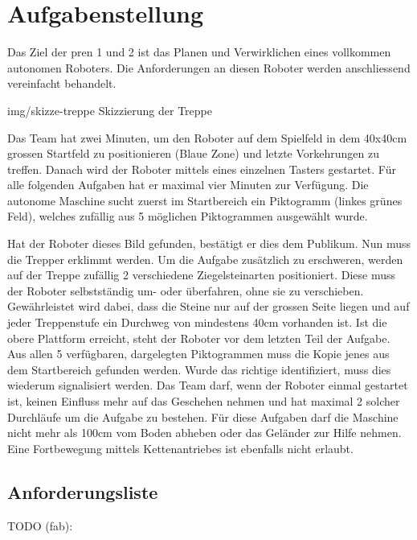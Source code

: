 \section{Aufgabenstellung}

Das Ziel der \acrfull{pren} 1 und 2 ist das Planen und Verwirklichen eines vollkommen autonomen Roboters. Die Anforderungen an diesen Roboter werden anschliessend vereinfacht behandelt. 

\image
 {img/skizze-treppe}
 {Skizzierung der Treppe}
 
Das Team hat zwei Minuten, um den Roboter auf dem Spielfeld in dem 40x40cm grossen 
Startfeld zu positionieren (Blaue Zone) und letzte Vorkehrungen zu treffen. 
Danach wird der Roboter mittels eines einzelnen Tasters gestartet. 
Für alle folgenden Aufgaben hat er maximal vier Minuten zur Verfügung. 
Die autonome Maschine sucht zuerst im Startbereich ein Piktogramm 
(linkes grünes Feld), welches zufällig aus 5 möglichen Piktogrammen ausgewählt wurde. 

Hat der Roboter dieses Bild gefunden, bestätigt er dies dem Publikum. 
Nun muss die Trepper erklimmt werden. Um die Aufgabe zusätzlich zu erschweren,
werden auf der Treppe zufällig 2 verschiedene Ziegelsteinarten positioniert. 
Diese muss der Roboter selbstständig um- oder überfahren, ohne sie zu verschieben.
Gewährleistet wird dabei, dass die Steine nur auf der grossen Seite liegen 
und auf jeder Treppenstufe ein Durchweg von mindestens 40cm vorhanden ist. 
Ist die obere Plattform erreicht, steht der Roboter vor dem letzten Teil der Aufgabe. 
Aus allen 5 verfügbaren, dargelegten Piktogrammen muss die Kopie jenes aus dem 
Startbereich gefunden werden. Wurde das richtige identifiziert, 
muss dies wiederum signalisiert werden. Das Team darf,
wenn der Roboter einmal gestartet ist, 
keinen Einfluss mehr auf das Geschehen nehmen und hat maximal 2 solcher Durchläufe 
um die Aufgabe zu bestehen. Für diese Aufgaben darf die Maschine nicht mehr 
als 100cm vom Boden abheben oder das Geländer zur Hilfe nehmen. 
Eine Fortbewegung mittels Kettenantriebes ist ebenfalls nicht erlaubt. 

\subsection{Anforderungsliste}
\label{sec:anforderungsliste}

TODO (fab):